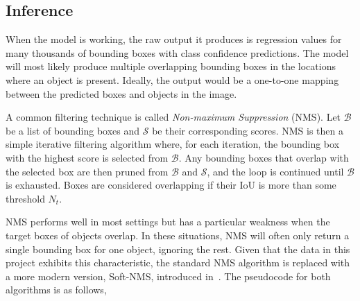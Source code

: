 \subsection{Inference}

When the model is working, the raw output it produces is regression values for many thousands of bounding boxes with class confidence predictions.
The model will most likely produce multiple overlapping bounding boxes in the locations where an object is present.
Ideally, the output would be a one-to-one mapping between the predicted boxes and objects in the image.

A common filtering technique is called \textit{Non-maximum Suppression} (NMS).
Let \( \mathcal{B} \) be a list of bounding boxes and \( \mathcal{S} \) be their corresponding scores.
NMS is then a simple iterative filtering algorithm where, for each iteration, the bounding box with the highest score is selected from \(\mathcal{B}\).
Any bounding boxes that overlap with the selected box are then pruned from \(\mathcal{B}\) and \(\mathcal{S}\), and the loop is continued until \(\mathcal{B}\) is exhausted.
Boxes are considered overlapping if their IoU is more than some threshold \(N_t\).

NMS performs well in most settings but has a particular weakness when the target boxes of objects overlap.
In these situations, NMS will often only return a single bounding box for one object, ignoring the rest.
Given that the data in this project exhibits this characteristic, the standard NMS algorithm is replaced with a more modern version, Soft-NMS, introduced in\ \textcite{bodla2017softnms}.
The pseudocode for both algorithms is as follows,

